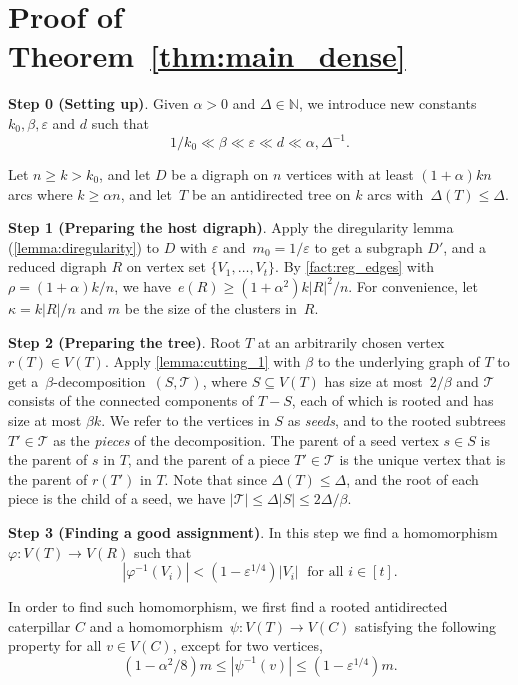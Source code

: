 \documentclass[11pt]{article}
\numberwithin{equation}{section}
\newcommand{\inv}{^{-1}}
\renewcommand{\geq}{\geqslant}
\renewcommand{\leq}{\leqslant}
\newcommand{\defi}[1]{\emph{\color{red!50!black}#1}}
\def\NN{\mathbb N}
\def\inv{^{-1}}
\let\eps=\varepsilon
\let\phi=\varphi
\newcommand{\cT}{\mathcal{T}}
\theoremstyle{definition}
\def\eps{{\varepsilon}}
\begin{document}
\section{Proof of Theorem~\ref{thm:main_dense}}


\textbf{Step 0 (Setting up)}.
Given $\alpha > 0$ and $\Delta\in \NN$, we introduce new constants $k_0, \beta, \eps$ and $d$ such that
\[  
1/k_0 \ll \beta \ll \eps \ll d \ll \alpha,\Delta\inv.
\]

Let $n \geq k> k_0$, and let $D$ be a digraph on $n$ vertices with at least $(1+\alpha)kn$ arcs
where $k\geq \alpha n$, and let~$T$ be an antidirected tree on $k$ arcs with~${\Delta(T)\leq \Delta}$. 


\textbf{Step 1 (Preparing the host digraph)}. Apply the diregularity lemma (\cref{lemma:diregularity}) to $D$ with $\eps$ and~${m_0 = 1/\eps}$
to get a subgraph $D'$, and a reduced digraph $R$ on vertex set $\{V_1,\dots,V_t\}$. By \cref{fact:reg_edges} with~${\rho = (1+\alpha)k/n}$,
we have~${e(R)\geq (1+\alpha^2)k|R|^2/n}$. For convenience, let~${\kappa = k|R|/n}$ and $m$ be the size of the clusters in~$R$.

\textbf{Step 2 (Preparing the tree)}. Root $T$ at an arbitrarily chosen vertex $r(T) \in V(T)$.
Apply \cref{lemma:cutting_1} with $\beta$ to the underlying graph of $T$ to get a~$\beta$-decomposition~$(S,\cT)$, where $S\subseteq V(T)$ has size at most~$2/\beta$ and $\mathcal{T}$ consists of the connected components of $T-S$, each of which is rooted and has size at most $\beta k$. We refer to the vertices in $S$ as \defi{seeds}, and to the rooted subtrees $T'\in \mathcal{T}$ as the \defi{pieces} of the decomposition. The parent of a seed vertex $s\in S$ is the parent of $s$ in $T$, and the parent of a piece $T'\in \mathcal{T}$ is the unique vertex that is the parent of $r(T')$ in $T$. Note that since $\Delta(T)\leq \Delta$, and the root of each piece is the child of a seed, we have $|\mathcal{T}|\leq \Delta |S| \leq 2\Delta/\beta$.

\textbf{Step 3 (Finding a good assignment)}. In this step we find a homomorphism $\phi:V(T) \longrightarrow V(R)$ such that
\begin{equation}\label{eq:assignment}
    |\phi\inv(V_i)| < (1- \eps^{1/4})|V_i|\;\text{ for all } i \in [t].
\end{equation}

In order to find such homomorphism, we first find a rooted antidirected caterpillar $C$ and
a homomorphism~$\psi:V(T)\longrightarrow V(C)$ satisfying the following property for
all $v \in V(C)$, except for two vertices,
\begin{equation}
    \label{eq:full_cat}
    (1-\alpha^2/8)m \leq |\psi\inv(v)|\leq (1-\eps^{1/4})m.
\end{equation}
\end{document}
